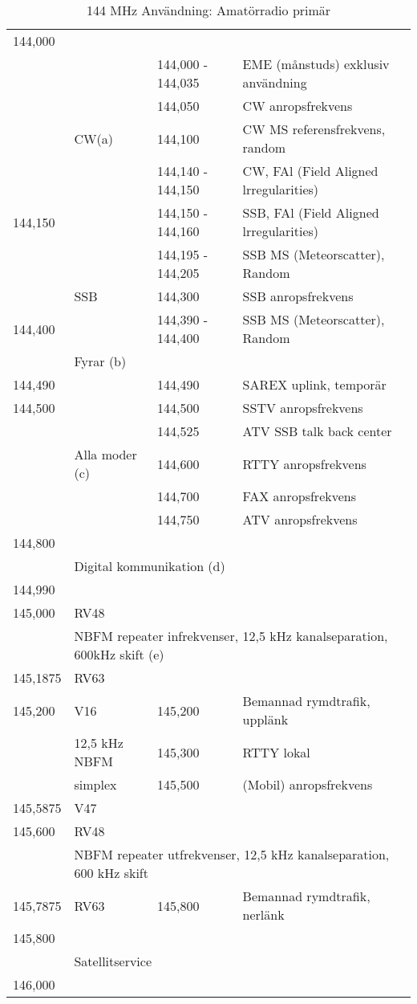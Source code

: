 \setlongtables
\begin{longtable}{llll}
\caption{144 MHz Användning: Amatörradio primär} \\

144,000 & & & \\
        &       & 144,000 - 144,035 & EME (månstuds) exklusiv användning \\
        &       & 144,050           & CW anropsfrekvens \\
        & CW(a) & 144,100           & CW MS referensfrekvens, random \\
        &       & 144,140 - 144,150 & CW, FAl (Field Aligned lrregularities) \\
144,150 &       & 144,150 - 144,160 & SSB, FAl (Field Aligned lrregularities) \\
        &       & 144,195 - 144,205 & SSB MS (Meteorscatter), Random \\
        & SSB   & 144,300           & SSB anropsfrekvens \\
144,400 &       & 144,390 - 144,400 & SSB MS (Meteorscatter), Random \\
        & Fyrar (b) & & \\
144,490 &       & 144,490 & SAREX uplink, temporär \\
144,500 &       & 144,500 & SSTV anropsfrekvens \\
        &       & 144,525 & ATV SSB talk back center \\
        & Alla moder (c) & 144,600 & RTTY anropsfrekvens \\
        &       & 144,700 & FAX anropsfrekvens \\
        &       & 144,750 & ATV anropsfrekvens \\
144,800 & & & \\
        & \multicolumn{3}{l}{Digital kommunikation (d)} \\
144,990 & & & \\
145,000 & RV48 & & \\
        & \multicolumn{3}{l}{NBFM repeater infrekvenser, 12,5 kHz kanalseparation, 600kHz skift (e)} \\
145,1875 & RV63 & & \\
145,200 & V16   & 145,200 & Bemannad rymdtrafik, upplänk \\
        & 12,5 kHz NBFM & 145,300 & RTTY lokal \\
        & simplex & 145,500 & (Mobil) anropsfrekvens \\
145,5875 & V47 & & \\
145,600 & RV48 & & \\
        & \multicolumn{3}{l}{NBFM repeater utfrekvenser, 12,5 kHz kanalseparation, 600 kHz skift} \\
145,7875 & RV63 & 145,800 & Bemannad rymdtrafik, nerlänk \\
145,800 & & & \\
        & \multicolumn{3}{l}{Satellitservice} \\
146,000 & & & \\
\end{longtable}

